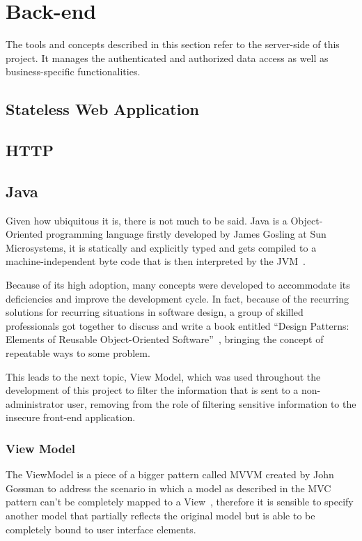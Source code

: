 \section{Back-end}\label{cha:concepts:sec:backend}
The tools and concepts described in this section refer to the server-side of this project. It manages the authenticated and authorized data access as well as business-specific functionalities.

\subsection{Stateless Web Application}

\subsection{HTTP}
\subsection{Java}
Given how ubiquitous it is, there is not much to be said. Java is a Object-Oriented programming language firstly developed by James Gosling at Sun Microsystems, it is statically and explicitly typed and gets compiled to a machine-independent byte code that is then interpreted by the \gls{JVM}~\cite{java}.

Because of its high adoption, many concepts were developed to accommodate its deficiencies and improve the development cycle. In fact, because of the recurring solutions for recurring situations in software design, a group of skilled professionals got together to discuss and write a book entitled ``Design Patterns: Elements of Reusable Object-Oriented Software''~\cite{patterns}, bringing the concept of repeatable ways to some problem.

This leads to the next topic, View Model, which was used throughout the development of this project to filter the information that is sent to a non-administrator user, removing from the role of filtering sensitive information to the insecure front-end application.

\subsubsection{View Model}
The ViewModel is a piece of a bigger pattern called \gls{MVVM} created by John Gossman to address the scenario in which a model as described in the \gls{MVC} pattern can't be completely mapped to a View~\cite{viewmodel}, therefore it is sensible to specify another model that partially reflects the original model but is able to be completely bound to user interface elements.

